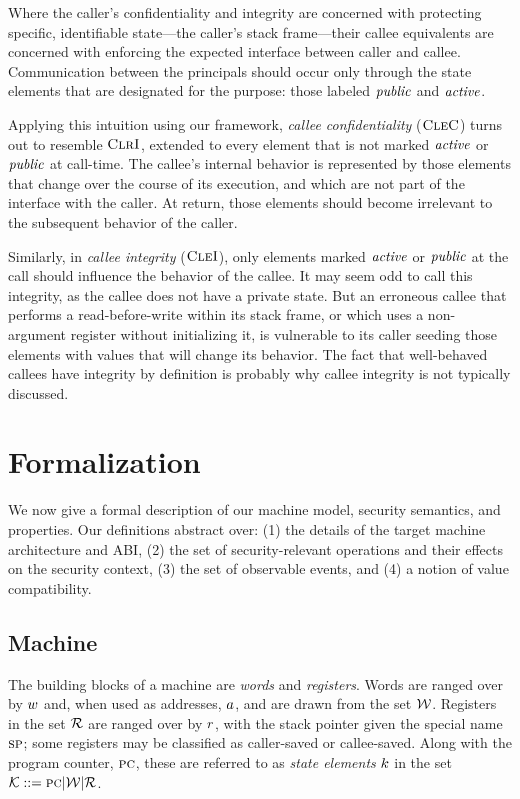 \documentclass[10pt,conference]{ieeetran}%
\theoremstyle{definition}
\begin{document}
Where the caller's confidentiality and integrity are concerned with protecting specific,
identifiable state---the caller's stack frame---their callee equivalents are concerned
with enforcing the expected interface between caller and callee. Communication between
the principals should occur only through the state elements that are designated for the
purpose: those labeled \(\mathit{public}\) and \(\mathit{active}\).

Applying this intuition using our framework, \emph{callee confidentiality} (\(\textnormal{\sc CleC}\))
turns out to resemble \(\textnormal{\sc ClrI}\), extended to every element that is not marked \(\mathit{active}\)
or \(\mathit{public}\) at call-time. The callee's internal behavior is represented by those
elements that change over the course of its execution, and which are not part of the
interface with the caller. At return, those elements should become irrelevant to the
subsequent behavior of the caller.

Similarly, in \emph{callee integrity} (\(\textnormal{\sc CleI}\)), only elements marked \(\mathit{active}\)
or \(\mathit{public}\) at the call should influence the behavior of the callee. It may seem
odd to call this integrity, as the callee does not have a private state. But
an erroneous callee that performs a read-before-write within its stack
frame, or which uses a non-argument register without initializing it, is vulnerable
to its caller seeding those elements with values that will change its behavior.
The fact that well-behaved callees have integrity by definition is probably why
callee integrity is not typically discussed.

\section{Formalization}
\label{sec:formal}

We now give a formal description of our machine model, security semantics,
and properties. Our definitions abstract over: (1) the details of  the target machine
architecture and ABI, (2) the set of security-relevant operations and their effects on
the security context, (3) the set of observable events, and (4) a notion of value compatibility.

\subsection{Machine}
The building blocks of a machine are {\em words} and {\em registers}.
Words are ranged over by \(w\) and, when used as addresses, \(a\),
and are drawn from the set \({\mathcal W}\).
Registers in the set \({\mathcal R}\) are ranged over by \(r\), with the stack pointer
given the special name \(\textsc{sp}\);
some registers may be classified as caller-saved or callee-saved.
Along with the program counter, \(\textsc{pc}\), these are referred to as
{\em state elements} \(k\) in the set \({\mathcal K} ::= \textsc{pc} | {\mathcal W} | {\mathcal R}\).
\end{document}

